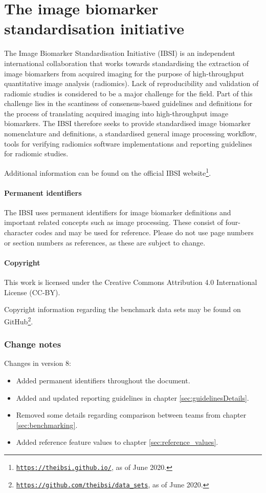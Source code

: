 \documentclass[fleqn,a4paper,oneside,openany]{book}
\begin{document}
\newpage
\chapter*{The image biomarker standardisation initiative}
The Image Biomarker Standardisation Initiative (IBSI) is an independent international collaboration that works towards standardising the extraction of image biomarkers from acquired imaging for the purpose of high-throughput quantitative image analysis (radiomics). Lack of reproducibility and validation of radiomic studies is considered to be a major challenge for the field. Part of this challenge lies in the scantiness of consensus-based guidelines and definitions for the process of translating acquired imaging into high-throughput image biomarkers. The IBSI therefore seeks to provide standardised image biomarker nomenclature and definitions, a standardised general image processing workflow, tools for verifying radiomics software implementations and reporting guidelines for radiomic studies.

Additional information can be found on the official IBSI website\footnote{\texttt{\url{https://theibsi.github.io/}}, as of June 2020.}.

\subsubsection*{Permanent identifiers}
The IBSI uses permanent identifiers for image biomarker definitions and important related concepts such as image processing. These consist of four-character codes and may be used for reference. Please do not use page numbers or section numbers as references, as these are subject to change.

\subsubsection*{Copyright}
This work is licensed under the Creative Commons Attribution 4.0 International License (CC-BY).

Copyright information regarding the benchmark data sets may be found on GitHub\footnote{\texttt{\url{https://github.com/theibsi/data\_sets}}, as of June 2020.}.

\subsection*{Change notes}

\noindent Changes in version 8:
\begin{itemize}
    \item Added permanent identifiers throughout the document.
    \item Added and updated reporting guidelines in chapter \ref{sec:guidelinesDetails}.
    \item Removed some details regarding comparison between teams from chapter \ref{sec:benchmarking}.
    \item Added reference feature values to chapter \ref{sec:reference_values}.
\end{itemize}
\end{document}

